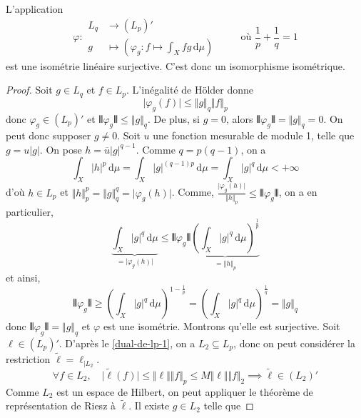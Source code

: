 
  \begin{theorem}
    L'application
    \[
    \varphi :
    \begin{array}{ll}
      L_q &\rightarrow (L_p)' \\
      g &\mapsto \left( \varphi_g : f \mapsto \int_X f g \, \mathrm{d}\mu \right)
    \end{array}
    \qquad \text{ où } \frac{1}{p} + \frac{1}{q} = 1
    \]
    est une isométrie linéaire surjective. C'est donc un isomorphisme isométrique.
  \end{theorem}

  \begin{proof}
    Soit $g \in L_q$ et $f \in L_p$. L'inégalité de Hölder donne
    \[ \vert \varphi_g(f) \vert \leq \Vert g \Vert_q \Vert f \Vert_p \]
    donc $\varphi_g \in (L_p)'$ et $\VERT \varphi_g \VERT \leq \Vert g \Vert_q$. De plus, si $g = 0$, alors $\VERT \varphi_g \VERT = \Vert g \Vert_q = 0$. On peut donc supposer $g \neq 0$.
    \newpar
     Soit $u$ une fonction mesurable de module 1, telle que $g = u \vert g \vert$. On pose $h = \overline{u} \vert g \vert^{q-1}$. Comme $q = p(q-1)$, on a
    \[ \int_X \vert h \vert^p \, \mathrm{d}\mu = \int_X \vert g \vert^{(q-1)p} \, \mathrm{d}\mu = \int_X \vert g \vert^{q} \, \mathrm{d}\mu < + \infty \]
    d'où $h \in L_p$ et $\Vert h \Vert_p^p = \Vert g \Vert_q^q = \vert \varphi_g(h) \vert$. Comme, $\frac{\vert \varphi_g(h) \vert}{\Vert h \Vert_p} \leq \VERT \varphi_g \VERT$, on a en particulier,
    \[ \underbrace{\int_X \vert g \vert^{q} \, \mathrm{d}\mu}_{= \vert \varphi_g(h) \vert} \leq \VERT \varphi_g \VERT \underbrace{\left ( \int_X \vert g \vert^{q} \, \mathrm{d}\mu \right )^{\frac{1}{p}}}_{= \Vert h \Vert_p} \]
    et ainsi,
    \[ \VERT \varphi_g \VERT \geq \left ( \int_X \vert g \vert^{q} \, \mathrm{d}\mu \right )^{1 - \frac{1}{p}} = \left ( \int_X \vert g \vert^{q} \, \mathrm{d}\mu \right )^{\frac{1}{q}} = \Vert g \Vert_q \]
    donc $\VERT \varphi_g \VERT = \Vert g \Vert_q$ et $\varphi$ est une isométrie.
    \newpar
    Montrons qu'elle est surjective. Soit $\ell \in (L_p)'$. D'après le \cref{dual-de-lp-1}, on a $L_2 \subseteq L_p$, donc on peut considérer la restriction $\widetilde{\ell} = \ell_{| L_2}$.
    \[ \forall f \in L_2, \quad \vert \widetilde{\ell}(f) \vert \leq \Vert \ell \Vert \Vert f \Vert_p \leq M \Vert \ell \Vert \Vert f \Vert_2 \implies \widetilde{\ell} \in (L_2)' \]
    Comme $L_2$ est un espace de Hilbert, on peut appliquer le théorème de représentation de Riesz à $\widetilde{\ell}$. Il existe $g \in L_2$ telle que

\end{proof}

